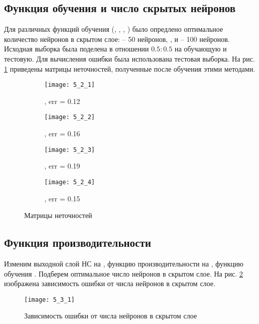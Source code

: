\subsection{Функция обучения и число скрытых нейронов}

Для различных функций обучения (, , , ) было опредлено оптимальное количество нейронов в скрытом слое:  -- 50 нейронов, ,  и  -- 100 нейронов. Исходная выборка была поделена в отношении $0.5 : 0.5$ на обучающую и тестовую. Для вычисления ошибки была использована тестовая выборка. На рис. \ref{fig:5_2_1} приведены матрицы неточностей, полученные после обучения этими методами.

\begin{figure}[H]
\begin{center}
	\begin{subfigure}[b]{0.49\textwidth}
		\texttt{[image: 5\_2\_1]}
		\caption{, err = 0.12}
	\end{subfigure}
	\begin{subfigure}[b]{0.49\textwidth}
		\texttt{[image: 5\_2\_2]}
		\caption{, err = 0.16}
	\end{subfigure}
	\begin{subfigure}[b]{0.49\textwidth}
		\texttt{[image: 5\_2\_3]}
		\caption{, err = 0.19}
	\end{subfigure}
	\begin{subfigure}[b]{0.49\textwidth}
		\texttt{[image: 5\_2\_4]}
		\caption{, err = 0.15}
	\end{subfigure}
	\caption{Матрицы неточностей}
	\label{fig:5_2_1}
\end{center}
\end{figure}

\subsection{Функция производительности}

Изменим выходной слой НС на , функцию производительности на , функцию обучения . Подберем оптимальное число нейронов в скрытом слое. На рис. \ref{fig:5_3_1} изображена зависимость ошибки от числа нейронов в скрытом слое.
\begin{figure}[H]
\begin{center}
	\texttt{[image: 5\_3\_1]}
	\caption{Зависимость ошибки от числа нейронов в скрытом слое}
	\label{fig:5_3_1}
\end{center}
\end{figure}

